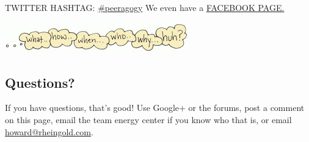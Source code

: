 TWITTER HASHTAG:
\href{http://twitter.com/search?q=\%23peeragogy\&src=typd}{\#peeragogy}
We even have a \href{https://www.facebook.com/peeragogy}{FACEBOOK PAGE.}

\begin{center}
\href{http://peeragogy.org/wp-content/uploads/2012/03/questions\_1000.gif}{\includegraphics[width=.9\textwidth]{../pictures/questions.jpg}}
\end{center}

\subsection{Questions?}

If you have questions, that's good! Use Google+ or the forums, post a
comment on this page, email the team energy center if you know who that
is, or email \href{mailto:howard@rheingold.com}{howard@rheingold.com}.
